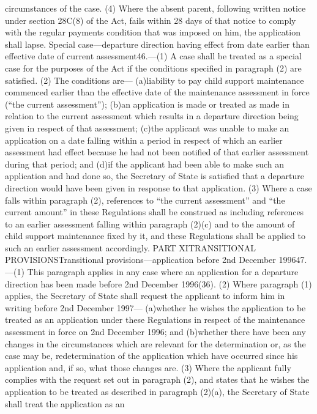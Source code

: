 \documentclass[a4paper]{article}
\begin{document}
circumstances of the case.
(4) Where the absent parent, following written notice under section 28C(8) of
the Act, fails within 28 days of that notice to comply with the regular payments
condition that was imposed on him, the application shall lapse.
Special case—departure direction having effect from date earlier than effective
date of current assessment46.—(1) A case shall be treated as a special case for
the purposes of the Act if the conditions specified in paragraph (2) are
satisfied.
(2) The conditions are—
(a)liability to pay child support maintenance commenced earlier than the
effective date of the maintenance assessment in force (“the current
assessment”);
(b)an application is made or treated as made in relation to the current
assessment which results in a departure direction being given in respect of that
assessment;
(c)the applicant was unable to make an application on a date falling within a
period in respect of which an earlier assessment had effect because he had not
been notified of that earlier assessment during that period; and
(d)if the applicant had been able to make such an application and had done so,
the Secretary of State is satisfied that a departure direction would have been
given in response to that application.
(3) Where a case falls within paragraph (2), references to “the current
assessment” and “the current amount” in these Regulations shall be construed as
including references to an earlier assessment falling within paragraph (2)(c)
and to the amount of child support maintenance fixed by it, and these
Regulations shall be applied to such an earlier assessment accordingly.
PART XITRANSITIONAL PROVISIONSTransitional provisions—application before 2nd
December 199647.—(1) This paragraph applies in any case where an application for
a departure direction has been made before 2nd December 1996(36).
(2) Where paragraph (1) applies, the Secretary of State shall request the
applicant to inform him in writing before 2nd December 1997—
(a)whether he wishes the application to be treated as an application under these
Regulations in respect of the maintenance assessment in force on 2nd December
1996; and
(b)whether there have been any changes in the circumstances which are relevant
for the determination or, as the case may be, redetermination of the application
which have occurred since his application and, if so, what those changes are.
(3) Where the applicant fully complies with the request set out in paragraph
(2), and states that he wishes the application to be treated as described in
paragraph (2)(a), the Secretary of State shall treat the application as an
\end{document}
